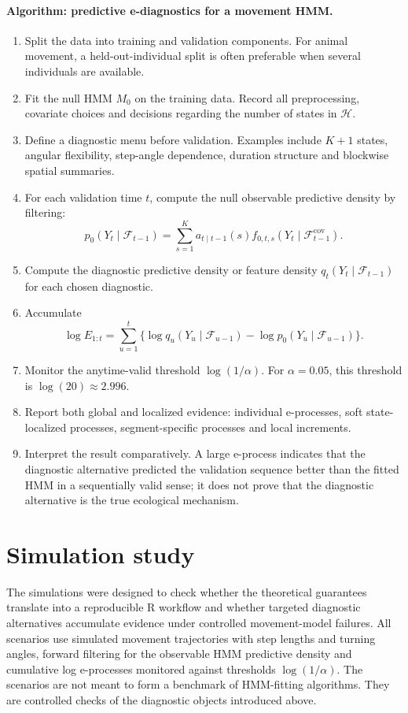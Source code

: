 \documentclass[pdflatex,sn-basic]{sn-jnl}
\theoremstyle{thmstyleone}
\theoremstyle{thmstyletwo}
\theoremstyle{thmstylethree}
\newcommand{\1}{\mathbf 1}
\newcommand{\calF}{\mathcal F}
\newcommand{\calH}{\mathcal H}
\begin{document}
\paragraph{Algorithm: predictive e-diagnostics for a movement HMM.}
\begin{enumerate}[leftmargin=1.5em]
\item Split the data into training and validation components. For animal movement, a held-out-individual split is often preferable when several individuals are available.
\item Fit the null HMM $M_0$ on the training data. Record all preprocessing, covariate choices and decisions regarding the number of states in $\calH$.
\item Define a diagnostic menu before validation. Examples include $K+1$ states, angular flexibility, step-angle dependence, duration structure and blockwise spatial summaries.
\item For each validation time $t$, compute the null observable predictive density by filtering:
\[
 p_0(Y_t\mid\calF_{t-1})=\sum_{s=1}^K a_{t\mid t-1}(s)f_{0,t,s}(Y_t\mid\calF_{t-1}^{\mathrm{cov}}).
\]
\item Compute the diagnostic predictive density or feature density $q_t(Y_t\mid\calF_{t-1})$ for each chosen diagnostic.
\item Accumulate
\[
 \log E_{1:t}=\sum_{u=1}^t\{\log q_u(Y_u\mid\calF_{u-1})-\log p_0(Y_u\mid\calF_{u-1})\}.
\]
\item Monitor the anytime-valid threshold $\log(1/\alpha)$. For $\alpha=0.05$, this threshold is $\log(20)\approx2.996$.
\item Report both global and localized evidence: individual e-processes, soft state-localized processes, segment-specific processes and local increments.
\item Interpret the result comparatively. A large e-process indicates that the diagnostic alternative predicted the validation sequence better than the fitted HMM in a sequentially valid sense; it does not prove that the diagnostic alternative is the true ecological mechanism.
\end{enumerate}

\section{Simulation study}
\label{sec:simulations}

The simulations were designed to check whether the theoretical guarantees translate into a reproducible R workflow and whether targeted diagnostic alternatives accumulate evidence under controlled movement-model failures. All scenarios use simulated movement trajectories with step lengths and turning angles, forward filtering for the observable HMM predictive density and cumulative log e-processes monitored against thresholds $\log(1/\alpha)$. The scenarios are not meant to form a benchmark of HMM-fitting algorithms. They are controlled checks of the diagnostic objects introduced above.
\end{document}
